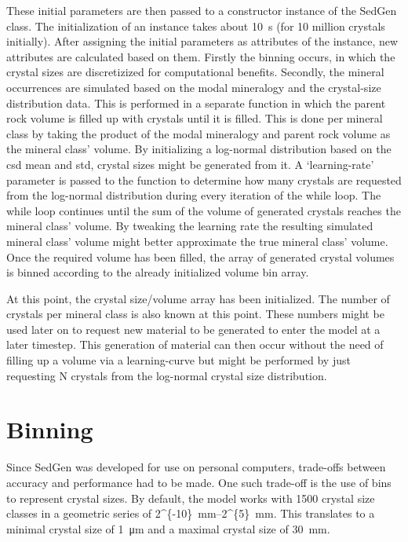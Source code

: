 These initial parameters are then passed to a constructor instance of the SedGen class. %
The initialization of an instance takes about \SI{10}{\second} (for 10 million crystals initially). %
After assigning the initial parameters as attributes of the instance, new attributes are calculated based on them. %
Firstly the binning occurs, in which the crystal sizes are discretizized for computational benefits. %
Secondly, the mineral occurrences are simulated based on the modal mineralogy and the crystal-size distribution data. %
    This is performed in a separate function in which the parent rock volume is filled up with crystals until it is filled. %
    This is done per mineral class by taking the product of the modal mineralogy and parent rock volume as the mineral class' volume. %
    By initializing a log-normal distribution based on the csd mean and std, crystal sizes might be generated from it.
    A `learning-rate' parameter is passed to the function to determine how many crystals are requested from the log-normal distribution during every iteration of the while loop. %
    The while loop continues until the sum of the volume of generated crystals reaches the mineral class' volume. %
    By tweaking the learning rate the resulting simulated mineral class' volume might better approximate the true mineral class' volume. %
    Once the required volume has been filled, the array of generated crystal volumes is binned according to the already initialized volume bin array. %

At this point, the crystal size/volume array has been initialized. %
The number of crystals per mineral class is also known at this point. %
These numbers might be used later on to request new material to be generated to enter the model at a later timestep. %
This generation of material can then occur without the need of filling up a volume via a learning-curve but might be performed by just requesting N crystals from the log-normal crystal size distribution. %



\section{Binning}
Since SedGen was developed for use on personal computers, trade-offs between accuracy and performance had to be made. %
One such trade-off is the use of bins to represent crystal sizes. %
By default, the model works with 1500 crystal size classes in a geometric series of \SIrange[parse-numbers=false]{2^{-10}}{2^{5}}{\milli\metre}. %
This translates to a minimal crystal size of \ca \SI{1}{\micro\metre} and a maximal crystal size of \SI{30}{\milli\metre}. %

